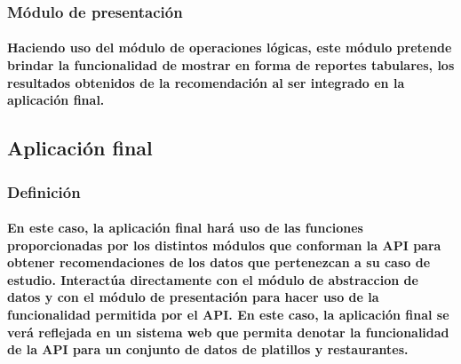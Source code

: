   \subsubsection{Módulo de presentación}
    \paragraph{Haciendo uso del módulo de operaciones lógicas, este módulo pretende brindar la funcionalidad de mostrar en forma de reportes tabulares, los resultados obtenidos de la recomendación al ser integrado en la aplicación final.}

\subsection{Aplicación final}
  \subsubsection{Definición}
    \paragraph{En este caso, la aplicación final hará uso de las funciones proporcionadas por los distintos módulos que conforman la API para obtener recomendaciones de los datos que pertenezcan a su caso de estudio. Interactúa directamente con el módulo de abstraccion de datos y con el módulo de presentación para hacer uso de la funcionalidad permitida por el API. En este caso, la aplicación final se verá reflejada en un sistema web que permita denotar la funcionalidad de la API para un conjunto de datos de platillos y restaurantes.}